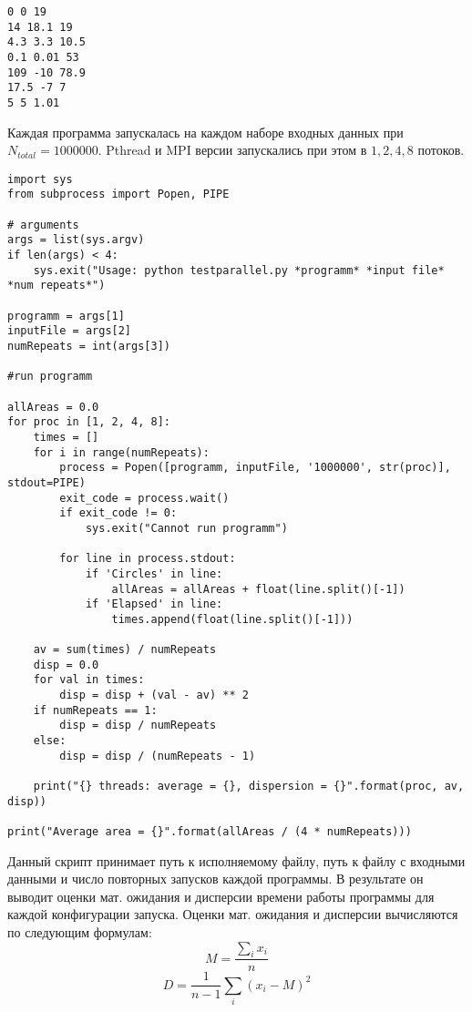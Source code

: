 \begin{lstlisting}[caption={Набор данных 3}, label={lst:input1}, style=crs_cpp]
0 0 19
14 18.1 19
4.3 3.3 10.5
0.1 0.01 53
109 -10 78.9
17.5 -7 7
5 5 1.01
\end{lstlisting}

Каждая программа запускалась на каждом наборе входных данных при $N_{total} = 1000000$. Pthread и MPI версии запускались при этом в $1, 2, 4, 8$ потоков.
\begin{lstlisting}[caption={Скрипт запуска}, label={lst:script}, style=crs_python]
import sys
from subprocess import Popen, PIPE

# arguments
args = list(sys.argv)
if len(args) < 4:
	sys.exit("Usage: python testparallel.py *programm* *input file* *num repeats*")

programm = args[1]
inputFile = args[2]
numRepeats = int(args[3])

#run programm

allAreas = 0.0
for proc in [1, 2, 4, 8]:
	times = []
	for i in range(numRepeats):
		process = Popen([programm, inputFile, '1000000', str(proc)], stdout=PIPE)
		exit_code = process.wait()
		if exit_code != 0:
			sys.exit("Cannot run programm")

		for line in process.stdout:
			if 'Circles' in line:
				allAreas = allAreas + float(line.split()[-1])
			if 'Elapsed' in line:
				times.append(float(line.split()[-1]))

	av = sum(times) / numRepeats
	disp = 0.0
	for val in times:
		disp = disp + (val - av) ** 2
	if numRepeats == 1:
		disp = disp / numRepeats
	else:
		disp = disp / (numRepeats - 1)

	print("{} threads: average = {}, dispersion = {}".format(proc, av, disp))

print("Average area = {}".format(allAreas / (4 * numRepeats)))
\end{lstlisting}

Данный скрипт принимает путь к исполняемому файлу, путь к файлу с входными данными и число повторных запусков каждой программы. В результате он выводит оценки мат. ожидания и дисперсии времени работы программы для каждой конфигурации запуска. Оценки мат. ожидания и дисперсии вычисляются по следующим формулам:
\begin{equation*}
M=\frac{\sum_{i}{x_i}}{n}
\end{equation*}
\begin{equation*}
D=\frac{1}{n - 1} {\sum_{i}{(x_i - M)^2}}
\end{equation*}

